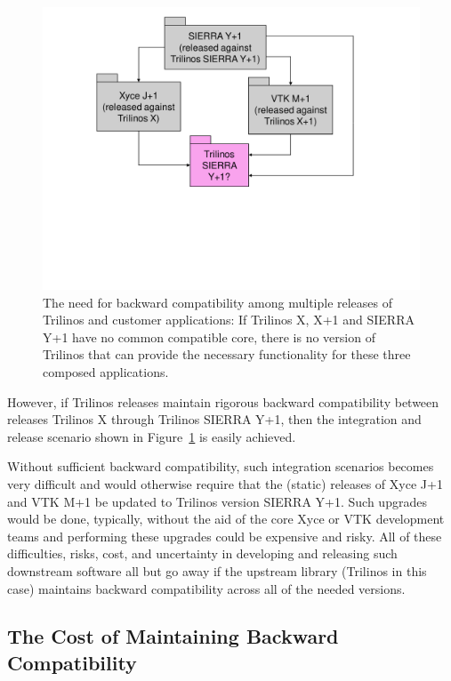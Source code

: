 \documentclass[11pt]{SANDreport}
\begin{document}
\begin{figure}
\begin{center}
\includegraphics[trim = 1.0in 2.7in 1.0in 0.2in, scale=0.55]
{XyceSierraVtkTrilinosCompatibility}
\caption{
The need for backward compatibility among multiple releases of Trilinos and customer applications: If Trilinos X, X+1 and SIERRA Y+1 have no common compatible core, there is no version of Trilinos that can provide the necessary functionality for these three composed applications.}
\label{fig:XyceSierraVtkTrilinosCompatibility}
\end{center}
\end{figure}

However, if Trilinos releases maintain rigorous backward compatibility between releases Trilinos X through Trilinos SIERRA Y+1, then the integration and release scenario shown in Figure~\ref{fig:XyceSierraVtkTrilinosCompatibility} is easily achieved.

Without sufficient backward compatibility, such integration scenarios becomes very difficult and would otherwise require that the (static) releases of Xyce J+1 and VTK M+1 be updated to Trilinos version SIERRA Y+1.  Such upgrades would be done, typically, without the aid of the core Xyce or VTK development teams and performing these upgrades could be expensive and risky.  All of these difficulties, risks, cost, and uncertainty in developing and releasing such downstream software all but go away if the upstream library (Trilinos in this case) maintains backward compatibility across all of the needed versions.


%
{}\subsection{The Cost of Maintaining Backward Compatibility}
\label{sec:costs_of_back_compat}
%
\end{document}
